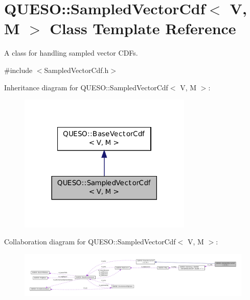 \hypertarget{class_q_u_e_s_o_1_1_sampled_vector_cdf}{\section{Q\-U\-E\-S\-O\-:\-:Sampled\-Vector\-Cdf$<$ V, M $>$ Class Template Reference}
\label{class_q_u_e_s_o_1_1_sampled_vector_cdf}
}


A class for handling sampled vector C\-D\-Fs.  




{\ttfamily \#include $<$Sampled\-Vector\-Cdf.\-h$>$}



Inheritance diagram for Q\-U\-E\-S\-O\-:\-:Sampled\-Vector\-Cdf$<$ V, M $>$\-:
\nopagebreak
\begin{figure}[H]
\begin{center}
\leavevmode
\includegraphics[width=234pt]{class_q_u_e_s_o_1_1_sampled_vector_cdf__inherit__graph}
\end{center}
\end{figure}


Collaboration diagram for Q\-U\-E\-S\-O\-:\-:Sampled\-Vector\-Cdf$<$ V, M $>$\-:
\nopagebreak
\begin{figure}[H]
\begin{center}
\leavevmode
\includegraphics[width=350pt]{class_q_u_e_s_o_1_1_sampled_vector_cdf__coll__graph}
\end{center}
\end{figure}
